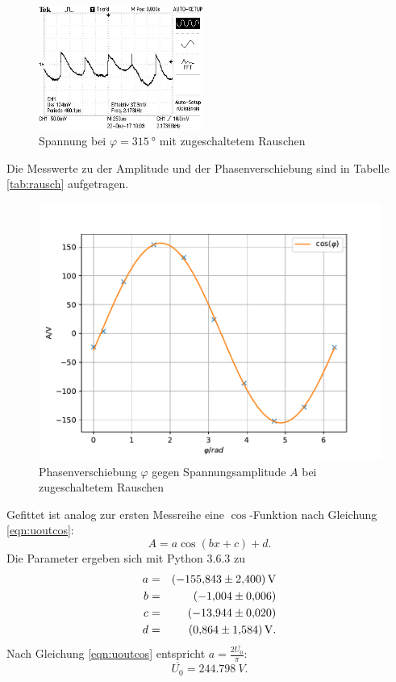 \begin{figure}[h!]
  \centering
  \includegraphics[width=0.48\textwidth]{315gradrausch.JPG}
  \caption{Spannung bei $\varphi=\SI{315}{°}$ mit zugeschaltetem Rauschen}
  \label{fig:315gradrausch}
\end{figure}
\FloatBarrier
Die Messwerte zu der Amplitude und der Phasenverschiebung sind in Tabelle \ref{tab:rausch} aufgetragen.

\begin{figure}[h!]
  \centering
  \includegraphics[width=\textwidth]{rausch.pdf}
  \caption{Phasenverschiebung $\varphi$ gegen Spannungsamplitude $A$ bei zugeschaltetem Rauschen}
  \label{fig:rauschplot}
\end{figure}
\FloatBarrier
Gefittet ist analog zur ersten Messreihe eine $\cos$-Funktion nach Gleichung \eqref{eqn:uoutcos}:
\begin{equation*}
  A= a \cos{(bx+c)}+d.
\end{equation*}
Die Parameter ergeben sich mit Python 3.6.3 zu
\begin{align*}
  a &=& \SI{-155.843  \pm 2.400}{V} \\
  b &=& \SI{  -1.004  \pm 0.006}{}\\
  c &=& \SI{ -13.944  \pm 0.020}{} \\
  d &=& \SI{   0.864  \pm 1.584}{V}.  \\
\end{align*}
Nach Gleichung \eqref{eqn:uoutcos} entspricht $a=\frac{2 \overline{U_{0}}}{\pi}$:
\begin{equation*}
  \overline{U_{0}}=\SI{244.798}{V}.
\end{equation*}
\FloatBarrier
